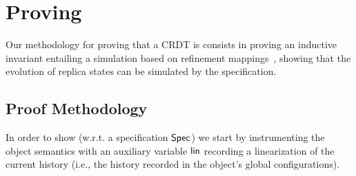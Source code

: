 \section{Proving \CRDTLin{}}
\label{sec:proofs}

Our methodology for proving that a CRDT is \crdtlinearizable{}
consists in proving an inductive invariant entailing a simulation
based on refinement
mappings~\cite{AbadiL91,DBLP:journals/iandc/LynchV95}, showing that
the evolution of replica states can be simulated by the specification.

\subsection{Proof Methodology}\label{ssec:proof-methodology}

In order to show \crdtlin{} (w.r.t. a specification $\mathsf{Spec}{}$) we start by
instrumenting the object semantics with an auxiliary variable
$\mathsf{lin}$ recording a linearization of the current history (i.e., the history recorded
in the object's global configurations). 

